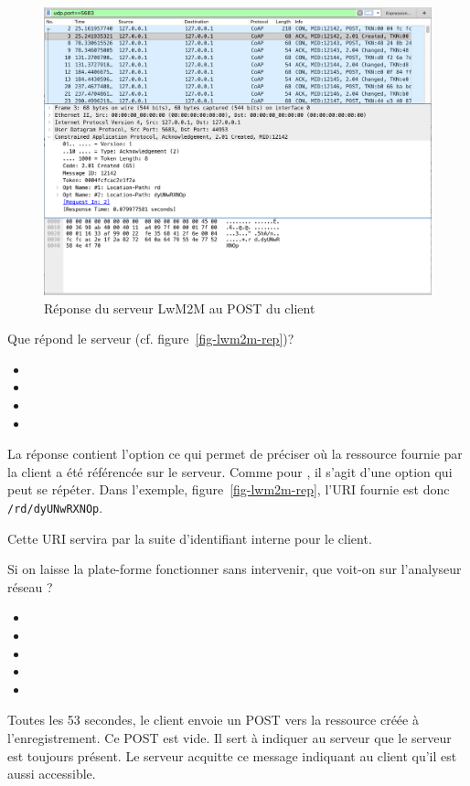 \begin{figure}[tbp]
\centerline{\includegraphics[width=.8\columnwidth]{Pictures/lwm2m-rep.png}}
\caption{Réponse du serveur LwM2M au POST du client}
\label{fig-lwm2m-rep}
\end{figure}

{
Que répond le serveur (cf. figure~\vref{fig-lwm2m-rep})?
\begin{itemize}[label=$\circ$]
   \item {}
   \item {}
   \item {}
   \item {}
\end{itemize}
}{
La réponse contient l'option \textit{} ce qui permet de préciser où la ressource fournie par la client a été référencée sur le serveur. Comme pour \textit{}, il s'agit d'une option qui peut se répéter. Dans l'exemple,  figure~\vref{fig-lwm2m-rep}, l'URI fournie est donc \texttt{/rd/dyUNwRXNOp}.

Cette URI servira par la suite d'identifiant interne pour le client.
}
 
 {
 Si on laisse la plate-forme fonctionner sans intervenir, que voit-on sur l'analyseur réseau ?
 
 \begin{itemize}[label=$\circ$]
   \item {}
   \item {}
   \item {}
   \item {}
   \item {}
\end{itemize}
}{
Toutes les 53 secondes, le client envoie un POST vers la ressource créée à l'enregistrement. Ce POST est vide. Il sert à indiquer au serveur que le serveur est toujours présent. Le serveur acquitte ce message indiquant au client qu'il est aussi accessible.
}
  

